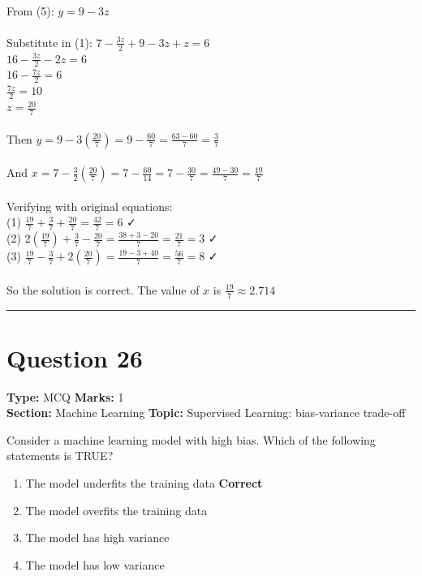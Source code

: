 \documentclass[11pt]{article}
\begin{document}
\\
From (5): \(y = 9 - 3z\)\\
\\
Substitute in (1): \(7 - \frac{3z}{2} + 9 - 3z + z = 6\)\\
\(16 - \frac{3z}{2} - 2z = 6\)\\
\(16 - \frac{7z}{2} = 6\)\\
\(\frac{7z}{2} = 10\)\\
\(z = \frac{20}{7}\)\\
\\
Then \(y = 9 - 3(\frac{20}{7}) = 9 - \frac{60}{7} = \frac{63-60}{7} = \frac{3}{7}\)\\
\\
And \(x = 7 - \frac{3}{2}(\frac{20}{7}) = 7 - \frac{60}{14} = 7 - \frac{30}{7} = \frac{49-30}{7} = \frac{19}{7}\)\\
\\
Verifying with original equations:\\
(1) \(\frac{19}{7} + \frac{3}{7} + \frac{20}{7} = \frac{42}{7} = 6\) ✓\\
(2) \(2(\frac{19}{7}) + \frac{3}{7} - \frac{20}{7} = \frac{38+3-20}{7} = \frac{21}{7} = 3\) ✓\\
(3) \(\frac{19}{7} - \frac{3}{7} + 2(\frac{20}{7}) = \frac{19-3+40}{7} = \frac{56}{7} = 8\) ✓\\
\\
So the solution is correct. The value of \(x\) is \(\frac{19}{7} \approx 2.714\)

\vspace{0.8em}
\hrule
\vspace{0.4em}
\section*{Question 26}
\textbf{Type:} MCQ \hfill \textbf{Marks:} 1\\
\textbf{Section:} Machine Learning \hfill \textbf{Topic:} Supervised Learning: bias-variance trade-off

Consider a machine learning model with high bias. Which of the following statements is TRUE?


\begin{enumerate}[label=\textbf{\Alph*.}, leftmargin=1.8em]
\item The model underfits the training data \hfill {\color{gategreen}\textbf{Correct}}\item The model overfits the training data\item The model has high variance\item The model has low variance\end{enumerate}
\end{document}
